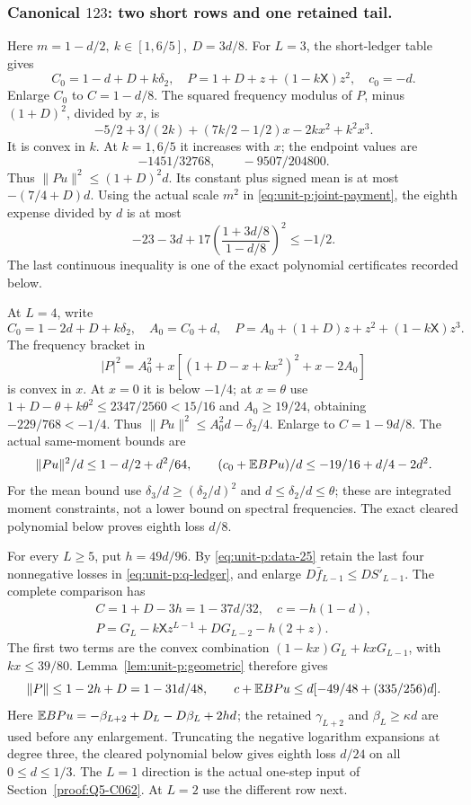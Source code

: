 \subsubsection{Canonical \(123\): two short rows and one retained tail.}\label{part:unit-p:canonical123}
Here \(m=1-d/2,\ k\in[1,6/5],\ D=3d/8\).
For \(L=3\), the short-ledger table gives
\[
 C_0=1-d+D+k\delta_2,\quad
 P=1+D+z+(1-k\mathsf X)z^2,\quad c_0=-d.
\]
Enlarge \(C_0\) to \(C=1-d/8\).
The squared frequency modulus of \(P\), minus \((1+D)^2\),
divided by \(x\), is
\[
 -5/2+3/(2k)+(7k/2-1/2)x-2kx^2+k^2x^3 .
\]
It is convex in \(k\). At \(k=1,6/5\) it increases with \(x\);
the endpoint values are
\[
 -1451/32768,\qquad -9507/204800.
\]
Thus \(\|Pu\|^2\le(1+D)^2d\).
Its constant plus signed mean is at most \(-(7/4+D)d\).
Using the actual scale \(m^2\) in
\eqref{eq:unit-p:joint-payment}, the eighth expense divided by \(d\)
is at most
\begin{equation}\label{eq:unit-p:data-29}
-23-3d+17\left(\frac{1+3d/8}{1-d/8}\right)^2\le-1/2.
\end{equation}
The last continuous inequality is one of the exact polynomial
certificates recorded below.

At \(L=4\), write
\[
 C_0=1-2d+D+k\delta_2,\quad A_0=C_0+d,\quad
 P=A_0+(1+D)z+z^2+(1-k\mathsf X)z^3 .
\]
The frequency bracket in
\[
 |P|^2=A_0^2+
 x[(1+D-x+kx^2)^2+x-2A_0]
\]
is convex in \(x\). At \(x=0\) it is below \(-1/4\);
at \(x=\theta\) use
\(1+D-\theta+k\theta^2\le2347/2560<15/16\) and
\(A_0\ge19/24\), obtaining \(-229/768<-1/4\).
Thus \(\|Pu\|^2\le A_0^2d-\delta_2/4\).
Enlarge to \(C=1-9d/8\). The actual same-moment bounds are
\begin{equation}\label{eq:unit-p:data-30}
\|Pu\|^2/d\le1-d/2+d^2/64,\qquad
 (c_0+\mathbb E BPu)/d\le-19/16+d/4-2d^2 .
\end{equation}
For the mean bound use \(\delta_3/d\ge(\delta_2/d)^2\) and
\(d\le\delta_2/d\le\theta\); these are integrated moment
constraints, not a lower bound on spectral frequencies.
The exact cleared polynomial below proves eighth loss \(d/8\).

For every \(L\ge5\), put \(h=49d/96\).
By \eqref{eq:unit-p:data-25} retain the last four nonnegative losses in
\eqref{eq:unit-p:q-ledger}, and enlarge
\(D\bar f_{L-1}\le DS'_{L-1}\).
The complete comparison has
\[
\begin{gathered}
 C=1+D-3h=1-37d/32,\quad c=-h(1-d),\\
 P=G_L-k\mathsf Xz^{L-1}+DG_{L-2}-h(2+z).
\end{gathered}
\]
The first two terms are the convex combination
\((1-kx)G_L+kxG_{L-1}\), with \(kx\le39/80\).
Lemma~\ref{lem:unit-p:geometric} therefore gives
\begin{equation}\label{eq:unit-p:data-31}
\|P\|\le1-2h+D=1-31d/48,\qquad
 c+\mathbb E BPu\le d[-49/48+(335/256)d].
\end{equation}
Here \(\mathbb E BPu=-\beta_{L+2}+D_L-D\beta_L+2hd\);
the retained \(\gamma_{L+2}\) and \(\beta_L\ge\kappa d\)
are used before any enlargement.
Truncating the negative logarithm expansions at degree three,
the cleared polynomial below gives eighth loss \(d/24\) on
all \(0\le d\le1/3\).
The \(L=1\) direction is the actual one-step input of
Section~\ref{proof:Q5-C062}. At \(L=2\) use the different row next.

